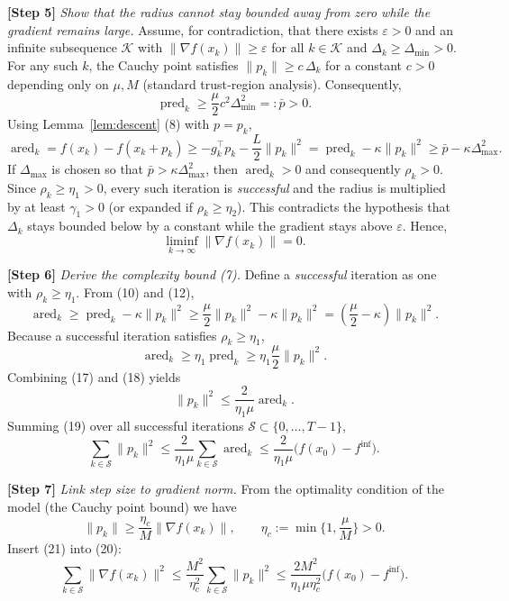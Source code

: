 \documentclass{article}
\begin{document}
\noindent\textbf{[Step 5]} \emph{Show that the radius cannot stay bounded away from zero
while the gradient remains large.}
Assume, for contradiction, that there exists $\varepsilon>0$ and an infinite
subsequence $\mathcal{K}$ with $\|\nabla f(x_{k})\|\ge\varepsilon$ for all $k\in\mathcal{K}$
and $\Delta_{k}\ge\Delta_{\min}>0$.
For any such $k$, the Cauchy point satisfies $\|p_{k}\|\ge
c\,\Delta_{k}$ for a constant $c>0$ depending only on $\mu,M$ (standard trust‑region
analysis). Consequently,
\[
\operatorname{pred}_{k}\ge\frac{\mu}{2}c^{2}\Delta_{\min}^{2}=:\bar{p}>0.
\tag{14}
\]
Using Lemma~\ref{lem:descent} (8) with $p=p_{k}$,
\[
\operatorname{ared}_{k}=f(x_{k})-f(x_{k}+p_{k})
\ge -g_{k}^{\top}p_{k}-\frac{L}{2}\|p_{k}\|^{2}
= \operatorname{pred}_{k}-\kappa\|p_{k}\|^{2}
\ge \bar{p}-\kappa\Delta_{\max}^{2}.
\tag{15}
\]
If $\Delta_{\max}$ is chosen so that $\bar{p}>\kappa\Delta_{\max}^{2}$,
then $\operatorname{ared}_{k}>0$ and consequently $\rho_{k}>0$.
Since $\rho_{k}\ge\eta_{1}>0$, every such iteration is \emph{successful}
and the radius is multiplied by at least $\gamma_{1}>0$ (or expanded if
$\rho_{k}\ge\eta_{2}$). This contradicts the hypothesis that $\Delta_{k}$ stays
bounded below by a constant while the gradient stays above $\varepsilon$.
Hence,
\[
\liminf_{k\to\infty}\|\nabla f(x_{k})\|=0.
\tag{16}
\]

\noindent\textbf{[Step 6]} \emph{Derive the complexity bound (7).}
Define a \emph{successful} iteration as one with $\rho_{k}\ge\eta_{1}$.
From (10) and (12),
\[
\operatorname{ared}_{k}
\ge \operatorname{pred}_{k}-\kappa\|p_{k}\|^{2}
\ge \frac{\mu}{2}\|p_{k}\|^{2}-\kappa\|p_{k}\|^{2}
= \left(\frac{\mu}{2}-\kappa\right)\|p_{k}\|^{2}.
\tag{17}
\]
Because a successful iteration satisfies $\rho_{k}\ge\eta_{1}$,
\[
\operatorname{ared}_{k}\ge \eta_{1}\operatorname{pred}_{k}
\ge \eta_{1}\frac{\mu}{2}\|p_{k}\|^{2}.
\tag{18}
\]
Combining (17) and (18) yields
\[
\|p_{k}\|^{2}\le \frac{2}{\eta_{1}\mu}\operatorname{ared}_{k}.
\tag{19}
\]
Summing (19) over all successful iterations $\mathcal{S}\subset\{0,\dots,T-1\}$,
\[
\sum_{k\in\mathcal{S}}\|p_{k}\|^{2}
\le \frac{2}{\eta_{1}\mu}\sum_{k\in\mathcal{S}}\operatorname{ared}_{k}
\le \frac{2}{\eta_{1}\mu}\bigl(f(x_{0})-f^{\inf}\bigr).
\tag{20}
\]

\noindent\textbf{[Step 7]} \emph{Link step size to gradient norm.}
From the optimality condition of the model (the Cauchy point bound) we have
\[
\|p_{k}\|\ge \frac{\eta_{c}}{M}\|\nabla f(x_{k})\|,
\qquad \eta_{c}:=\min\{1,\frac{\mu}{M}\}>0.
\tag{21}
\]
Insert (21) into (20):
\[
\sum_{k\in\mathcal{S}}\|\nabla f(x_{k})\|^{2}
\le \frac{M^{2}}{\eta_{c}^{2}}\sum_{k\in\mathcal{S}}\|p_{k}\|^{2}
\le \frac{2M^{2}}{\eta_{1}\mu\eta_{c}^{2}}\bigl(f(x_{0})-f^{\inf}\bigr).
\tag{22}
\]
\end{document}
